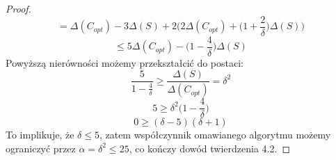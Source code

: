 \begin{proof}
\begin{equation}
        = \Delta(C_{opt}) - 3\Delta(S) + 2\Big(2\Delta(C_{opt}) + \Big(1 + \frac{2}{\delta} \Big)\Delta(S)\Big)
    \end{equation}
    \begin{equation}
        \leq 5\Delta(C_{opt}) - \Big(1 - \frac{4}{\delta} \Big)\Delta(S)
    \end{equation}
    Powyższą nierówności możemy przekształcić do postaci:
    \begin{equation}
        \frac{5}{1-\frac{4}{\delta}} \geq \frac{\Delta(S)}{\Delta(C_{opt})} = \delta^{2}
    \end{equation}
    \begin{equation}
        5 \geq \delta^{2} \Big(1 - \frac{4}{\delta} \Big)
    \end{equation}
    \begin{equation}
        0 \geq (\delta - 5)(\delta + 1)
    \end{equation}
    To implikuje, że $\delta \leq 5$, zatem współczynnik omawianego algorytmu możemy ograniczyć przez $\alpha = \delta^{2} \leq 25$, co kończy dowód twierdzenia 4.2.
\end{proof}